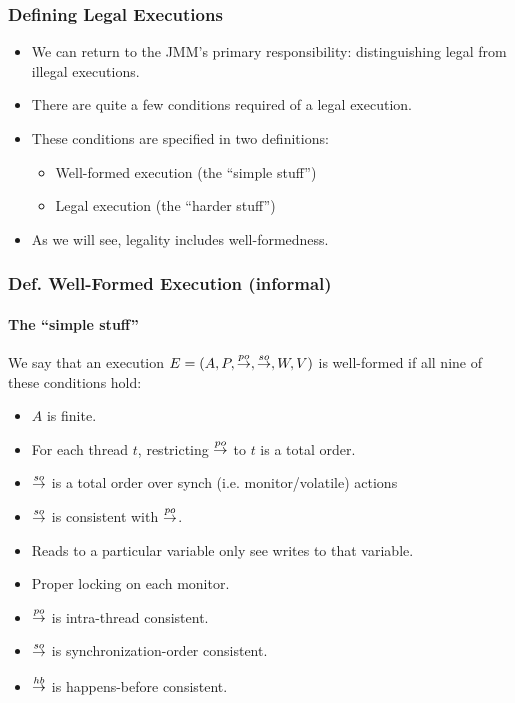 \begin{frame}
    \frametitle{Defining Legal Executions}

    \begin{itemize}
        \item We can return to the JMM's primary responsibility: distinguishing
              legal from illegal executions.
        \item There are quite a few conditions required of a legal execution.
        \item These conditions are specified in two definitions:
        \begin{itemize}[itemsep=0.3em,topsep=0.5em]
            \item Well-formed execution (the ``simple stuff'')
            \item Legal execution (the ``harder stuff'')
        \end{itemize}
        \item As we will see, legality includes well-formedness.
    \end{itemize}
\end{frame}

\begin{frame}
    \frametitle{\textbf{Def.} Well-Formed Execution (informal)}
    \framesubtitle{The ``simple stuff''}
    \small
    We say that an execution $E = (A, P, \overset{po}{\rightarrow}, \overset{so}{\rightarrow}, W, V)$ is
    well-formed if all nine of these conditions hold:

    \begin{itemize}[itemsep=0.3em]
        \item $A$ is finite.
        \item For each thread $t$, restricting $\overset{po}{\rightarrow}$ to $t$ is a total
              order.
        \item $\overset{so}{\rightarrow}$ is a total order over synch (i.e. monitor/volatile)
              actions
        \item $\overset{so}{\rightarrow}$ is consistent with $\overset{po}{\rightarrow}$.
        \item Reads to a particular variable only see writes to that variable.
        \item Proper locking on each monitor.
        \item $\overset{po}{\rightarrow}$ is intra-thread consistent.
        \item $\overset{so}{\rightarrow}$ is synchronization-order consistent.
        \item $\overset{hb}{\rightarrow}$ is happens-before consistent.
    \end{itemize}
\end{frame}

